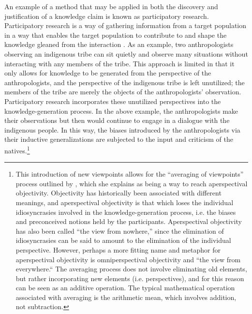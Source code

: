 \documentclass[a4paper]{article}
\begin{document}
An example of a method that may be applied in both the discovery and
justification of a knowledge claim is known as participatory research.
Participatory research is a way of gathering information from a target
population in a way that enables the target population to contribute to and
shape the knowledge gleaned from the interaction
\citep{bergold2012participatory}. As an example, two anthropologists observing
an indigenous tribe can sit quietly and observe many situations without
interacting with any members of the tribe. This approach is limited in that it
only allows for knowledge to be generated from the perspective of the
anthropologists, and the perspective of the indigenous tribe is left
unutilized; the members of the tribe are merely the objects of the
anthropologists' observation. Participatory research incorporates these
unutilized perspectives into the knowledge-generation process. In the above
example, the anthropologists make their observations but then would continue
to engage in a dialogue with the indigenous people. In this way, the biases
introduced by the anthropologists via their inductive generalizations are
subjected to the input and criticism of the natives.\footnote{This
    introduction of new viewpoints allows for the ``averaging of viewpoints''
    process outlined by \cite{datson1992objectivity}, which she explains as
    being a way to reach aperspectival objectivity. Objectivity has
    historically been associated with different meanings, and aperspectival
    objectivity is that which loses the individual idiosyncrasies involved in
    the knowledge-generation process, i.e. the biases and preconceived notions
    held by the participants. Aperspectival objectivity has also been called
    ``the view from nowhere,'' since the elimination of idiosyncrasies can be
    said to amount to the elimination of the individual perspective. However,
    perhaps a more fitting name and metaphor for aperspectival objectivity is
    omniperspectival objectivity and ``the view from everywhere.`` The
    averaging process does not involve eliminating old elements, but rather
    incorporating new elements (i.e. perspectives), and for this reason can be
    seen as an additive operation. The typical mathematical operation
associated with averaging is the arithmetic mean, which involves addition, not
subtraction.}
\end{document}
